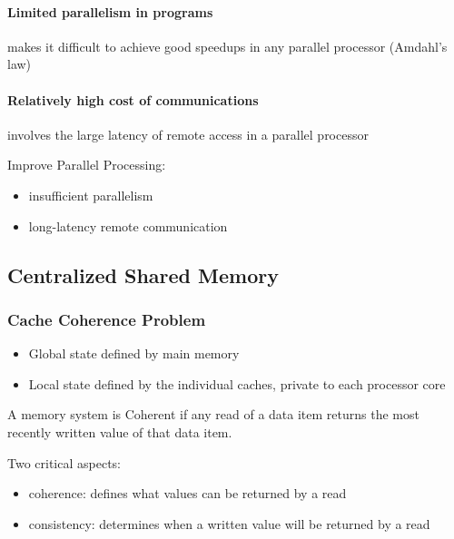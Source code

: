 \paragraph{Limited parallelism in programs} makes it difficult to achieve good speedups in any parallel processor (Amdahl's law)


\paragraph{Relatively high cost of communications} involves the large latency of remote access in a parallel processor


Improve Parallel Processing:
\begin{itemize}
    \item insufficient parallelism
    \item long-latency remote communication
\end{itemize}

\subsection{Centralized Shared Memory}

\subsubsection{Cache Coherence Problem}
\begin{itemize}
    \item Global state defined by main memory
    \item Local state defined by the individual
    caches, private to each processor core
\end{itemize}

A memory system is Coherent if any read of a data item returns the most recently written value of that data item. 

Two critical aspects:
\begin{itemize}
    \item coherence: defines what values can
    be returned by a read
    \item consistency: determines when a
    written value will be returned by a read
\end{itemize}

